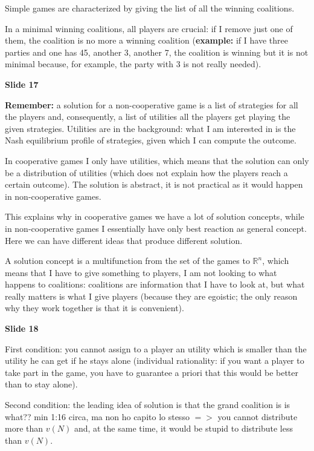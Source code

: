 \noindent Simple games are characterized by giving the list of all the 
winning coalitions.

\noindent In a minimal winning coalitions, all players are crucial: if I 
remove just one of them, the coalition is no more a winning coalition 
(\textbf{example:} if I have three parties and one has 45, another 3, 
another 7, the coalition is winning but it is not minimal because, for example, 
the party with 3 is not really needed).

\bigskip
\noindent \textbf{Slide 17}

\noindent \textbf{Remember:} a solution for a non-cooperative game is a list 
of strategies for all the players and, consequently, a list of utilities 
all the players get playing the given strategies. Utilities are in the 
background: what I am interested in is the Nash equilibrium profile of 
strategies, given which I can compute the outcome.

\noindent In cooperative games I only have utilities, which means that the 
solution can only be a distribution of utilities (which does not explain 
how the players reach a certain outcome). The solution is abstract, it is 
not practical as it would happen in non-cooperative games.

\noindent This explains why in cooperative games we have a lot of solution 
concepts, while in non-cooperative games I essentially have only best reaction 
as general concept. Here we can have different ideas that produce different 
solution. 

\noindent A solution concept is a multifunction from the set of the games to 
$\mathbb{R}^n$, which means that I have to give something to players, I am 
not looking to what happens to coalitions: coalitions are information that I 
have to look at, but what really matters is what I give players (because 
they are egoistic; the only reason why they work together is that it is 
convenient).

\bigskip
\noindent \textbf{Slide 18}

\noindent First condition: you cannot assign to a player an utility which is 
smaller than the utility he can get if he stays alone (individual 
rationality: if you want a player to take part in the game, you have to 
guarantee a priori that this would be better than to stay alone).

\noindent Second condition: the leading idea of solution is that the grand 
coalition is {\huge is what?? min 1:16 circa, ma non ho capito lo stesso} 
$=>$ you cannot distribute more than $v(N)$ and, at the same time, it would be 
stupid to distribute less than $v(N)$.

